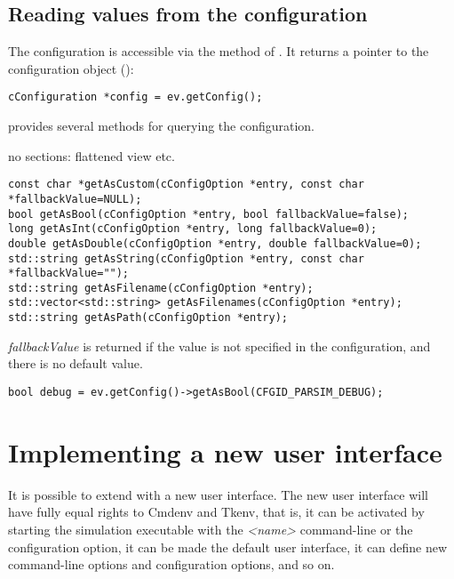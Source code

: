 \subsection{Reading values from the configuration}

The configuration is accessible via the  method of .
It returns a pointer to the configuration object ():

\begin{verbatim}
cConfiguration *config = ev.getConfig();
\end{verbatim}

 provides several methods for querying the configuration.

no sections: flattened view etc.

\begin{verbatim}
const char *getAsCustom(cConfigOption *entry, const char *fallbackValue=NULL);
bool getAsBool(cConfigOption *entry, bool fallbackValue=false);
long getAsInt(cConfigOption *entry, long fallbackValue=0);
double getAsDouble(cConfigOption *entry, double fallbackValue=0);
std::string getAsString(cConfigOption *entry, const char *fallbackValue="");
std::string getAsFilename(cConfigOption *entry);
std::vector<std::string> getAsFilenames(cConfigOption *entry);
std::string getAsPath(cConfigOption *entry);
\end{verbatim}

\textit{fallbackValue} is returned if the value is not specified in the configuration,
and there is no default value.

\begin{verbatim}
bool debug = ev.getConfig()->getAsBool(CFGID_PARSIM_DEBUG);
\end{verbatim}


\section{Implementing a new user interface}
\label{sec:plugin-exts:userinterface}

It is possible to extend {\opp} with a new user interface. The new
user interface will have fully equal rights to Cmdenv and Tkenv, that is,
it can be activated by starting the simulation executable with the
 \textit{<name>} command-line or the 
configuration option, it can be made the default user interface,
it can define new command-line options and configuration options,
and so on.


